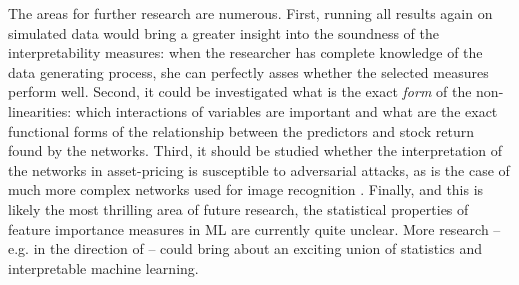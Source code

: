 The areas for further research are numerous. First, running all results again on simulated data would bring a greater insight into the soundness of the interpretability measures: when the researcher has complete knowledge of the data generating process, she can perfectly asses whether the selected measures perform well. Second, it could be investigated what is the exact \textit{form} of the non-linearities: which interactions of variables are important and what are the exact functional forms of the relationship between the predictors and stock return found by the networks. Third, it should be studied whether the interpretation of the networks in asset-pricing is susceptible to adversarial attacks, as is the case of much more complex networks used for image recognition \citep{ghorbani2019interpretation}. Finally, and this is likely the most thrilling area of future research, the statistical properties of feature importance measures in ML are currently quite unclear. More research -- e.g. in the direction of \cite{fisher2019all} -- could bring about an exciting union of statistics and interpretable machine learning.   



